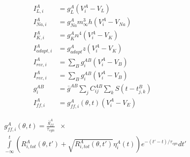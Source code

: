 \begin{align}
I_{L, i}^{A} &= g_{L}^{A} (V_{i}^{A} - V_{L}) \\
I_{Na, i}^{A} &= g_{Na}^{A} m_{\infty}^{3} h (V_{i}^{A} - V_{Na}) \\
I_{K, i}^{A} &= g_{K}^{A} n^{4} (V_{i}^{A} - V_{K}) \\
I_{adapt, i}^{A} &= g_{adapt}^{A} z (V_{i}^{A} - V_{K}) \\
I_{rec, i}^{A} &= \sum_{B} g_{i}^{AB} (V_{i}^{A} - V_{B}) \\
I_{rec, i}^{A} &= \sum_{B} g_{i}^{AB} (V_{i}^{A} - V_{B}) \\
g_{i}^{AB} &= \bar{g}^{AB} \sum_{j} C^{AB}_{ij} \sum_{k} S(t - t^{B}_{j, k}) \\
I_{ff, i}^{A} &= g_{ff, i}^{A} (\theta, t) (V_{i}^{A} - V_{E})
\end{align}

\begin{equation} 
\begin{split}
& g_{ff, i}^{A} (\theta, t)  = \frac{\bar{g}^{A}_{ff}}{\tau_{syn}} \;\; \times \\
& \int\limits_{-\infty}^{t}  \left( R_{i, tot}^{A} (\theta, t') + \sqrt{R_{i, tot}^{A} (\theta, t')}  \eta^{A}_{i}(t) \right) e^{-(t' - t) /\tau_{syn}} dt' 
\end{split}
\end{equation}





